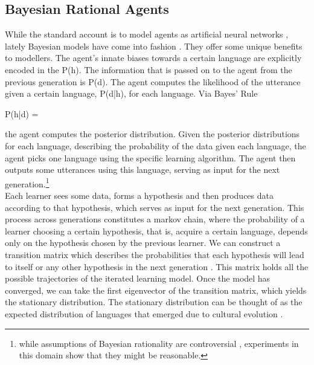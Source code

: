 \documentclass[12pt]{scrartcl}
\renewenvironment{equation}{\vspace{5mm}\begin{oldequation}}{\end{oldequation}\vspace{5mm}}
\begin{document}
\subsection*{Bayesian Rational Agents}

While the standard account is to model agents as artificial neural networks \parencite{kirby2002emergence}, lately Bayesian models have
come into fashion \parencite{perfors2011tutorial}. They offer some unique benefits to modellers.
The agent's innate biases towards a certain language are explicitly encoded in the P(h). The
information that is passed on to the agent from the previous generation is P(d). The agent
computes the likelihood of the utterance given a certain language, P(d|h), for each language. Via
Bayes' Rule

\begin{equation}
       P(h|d) = 
\end{equation}

the agent computes the posterior distribution. Given the posterior distributions for each language, describing the probability of the data given each language, the agent picks one language using the specific learning algorithm. The agent then
outputs some utterances using this language, serving as input for the next generation.\footnote{while assumptions of Bayesian rationality are controversial \parencite{marcus2013robust}, experiments in this domain \parencite{kalish2007iterated} show that they might be reasonable.}
\\

Each learner sees some data, forms a hypothesis and then produces data according to that hypothesis, which serves as input for the next generation. This process across generations constitutes a markov chain, where the probability of a learner choosing a certain hypothesis, that is, acquire a certain language, depends only on the hypothesis chosen by the previous learner. We can construct a transition matrix which describes the probabilities that each hypothesis will lead to itself or any other hypothesis in the next generation \parencite{ferdinand2008language}. This matrix holds all the possible trajectories of the iterated learning model. Once the model has converged, we can take the first eigenvector of the transition matrix, which yields the stationary distribution. The stationary distribution can be thought of as the expected distribution of languages that emerged due to cultural evolution \parencite{kirby2007innateness}.
\end{document}
